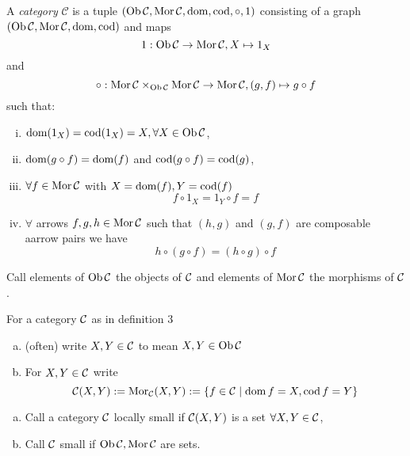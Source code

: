 \documentclass[a4paper]{report}
\begin{document}
\begin{defi}
  A \emph{category} $\mathcal C$ is a tuple $(\Ob \mathcal C, \Mor \mathcal C, \dom, \cod, \circ, 1)$ consisting of a graph $(\Ob \C, \Mor \C, \dom , \cod)$ and maps
  \[1: \Ob \C \to \Mor \C, X \mps 1_{X}\]
  and \[\circ: \Mor \C \tm_{\Ob \C} \Mor \C \to \Mor \C, (g,f) \mps g \circ f\]
  such that:
  \begin{enumerate}[(i)]
    \item $\dom (1_{X}) = \cod(1_{X}) = X, \forall X \in \Ob \C$,
    \item $\dom(g \circ f)=\dom (f)$ and $\cod(g \circ f)=\cod (g)$,
    \item $\forall f \in \Mor \C$ with $X = \dom (f), Y = \cod (f)$\[f \circ 1_{X} = 1_{Y} \circ f = f\]
    \item $\forall $ arrows $f, g, h \in \Mor \C$ such that $(h,g)$ and $(g,f)$ are composable aarrow pairs we have \[h \circ (g \circ f) = (h \circ g) \circ f\]
  \end{enumerate}
  Call elements of $\Ob \C$ the objects of $\C$ and elements of $\Mor \C$ the morphisms of $\C$.

\end{defi}

\begin{nota}
  For a category $\C$ as in definition 3
  \begin{enumerate}[(a)]
    \item (often) write $X, Y \in \C$ to mean $X, Y \in \Ob \C$
          \item For $X, Y \in \C$ write \[\C(X,Y):= \Mor_{\C}(X,Y) := \{f \in \C \mid \dom f = X, \cod f = Y\}\]
  \end{enumerate}
\end{nota}


\begin{defi}
  \begin{enumerate}[(a)]
    \item Call a category $\C$ locally small if $\C(X,Y)$ is a set $\forall X, Y \in \C$,
          \item Call $\C$ small if $\Ob \C, \Mor \C$ are sets.
  \end{enumerate}
\end{defi}
\end{document}
